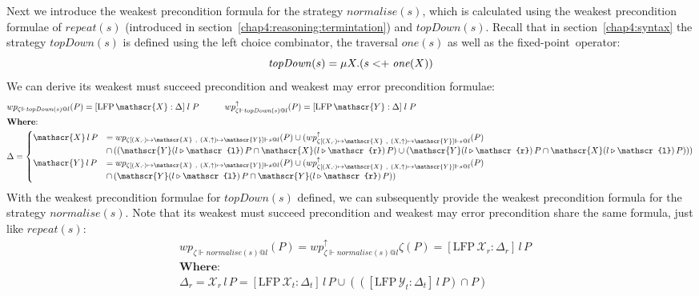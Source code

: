 Next we introduce the weakest precondition formula for the strategy $\mathit{normalise}(s)$, which is calculated using the weakest precondition formulae of $\mathit{repeat}(s)$ (introduced in section~\ref{chap4:reasoning:termintation}) and $\mathit{topDown}(s)$. Recall that in section~\ref{chap4:syntax} the strategy $\mathit{topDown}(s)$ is defined using the left choice combinator, the traversal $\mathit{one}(s)$ as well as the fixed-point~operator:
\[\mathit{topDown}(s) = \mu X. (s <\mathrel{\mathop+} \mathit{one}(X))\]
We can derive its weakest must succeed precondition and weakest may error precondition formulae:
\begin{align*}
    &wp_{\zeta \Vdash \mathit{topDown}(s)@l}(P) = [\text{LFP}\, \mathscr{X} : \Delta] \;l\;P
    \quad\quad\quad wp_{\zeta \Vdash \mathit{topDown}(s) @l}^\uparrow(P) = [\text{LFP}\, \mathscr{Y} : \Delta]\;l\;P\\
    &\text{\textbf{Where}:}\\
    &\Delta =
    \begin{cases}
        \mathscr{X}\,l\,P &= wp_{\zeta[(X, \cdot) \mapsto \mathscr{X} \sep (X, \uparrow) \mapsto \mathscr{Y}]\Vdash s@l}(P) \cup (wp_{\zeta[(X, \cdot) \mapsto \mathscr{X} \sep (X, \uparrow) \mapsto \mathscr{Y}] \Vdash s@l}^\uparrow (P) \\&\cap\, ((\mathscr{Y}(l\triangleright \mathscr{l})\,P \cap \mathscr{X}(l \triangleright \mathscr{r})\,P) \cup (\mathscr{Y}(l\triangleright \mathscr{r})\,P \cap \mathscr{X}(l \triangleright \mathscr{l})\,P)))\\
        \mathscr{Y}\,l\,P &= wp_{\zeta[(X, \cdot) \mapsto \mathscr{X} \sep (X, \uparrow) \mapsto \mathscr{Y}]\Vdash s@l}(P) \cup (wp_{\zeta[(X, \cdot) \mapsto \mathscr{X} \sep (X, \uparrow) \mapsto \mathscr{Y}]\Vdash s@l}^\uparrow (P) \\&\cap\, (\mathscr{Y} (l \triangleright \mathscr{l})\,P \cap \mathscr{Y} (l \triangleright \mathscr{r})\,P))
    \end{cases}
\end{align*}
With the weakest precondition formulae for $\mathit{topDown}(s)$ defined, we can subsequently  provide the weakest precondition formula for the strategy $\mathit{normalise}(s)$. Note that its weakest must succeed precondition and weakest may error precondition share the same formula, just like $\mathit{repeat}(s)$:
\begin{align*}
    &wp_{\zeta\Vdash\mathit{normalise}(s)@l}(P) = wp_{\zeta\Vdash\mathit{normalise}(s)@l}^\uparrow\zeta(P) = [\text{LFP}\, \mathscr{X}_r: \Delta_r]\,l\,P\\
    &\textbf{Where:}\\
    &\Delta_r = \mathscr{X}_r\,l\,P = [\text{LFP}\, \mathscr{X}_t : \Delta_t]\,l\,P \cup (([\text{LFP}\, \mathscr{Y}_t : \Delta_t] \,l\,P) \cap P)
\end{align*}
